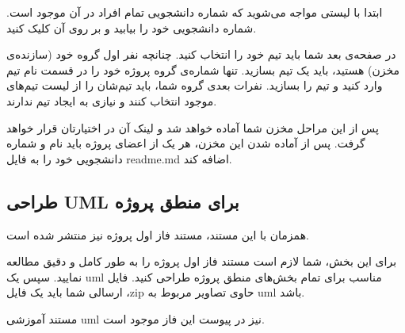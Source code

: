 \documentclass[]{article}
\begin{document}
ابتدا با لیستی مواجه می‌شوید که شماره دانشجویی تمام افراد در آن موجود است. شماره دانشجویی خود را بیابید و بر روی آن کلیک کنید.

در صفحه‌ی بعد شما باید تیم خود را انتخاب کنید. چنانچه نفر اول گروه خود (سازنده‌ی مخزن) هستید، باید یک تیم بسازید. تنها شماره‌ی گروه پروژه خود را در قسمت نام تیم وارد کنید و تیم را بسازید. نفرات بعدی گروه شما، باید تیم‌شان را از لیست تیم‌های موجود انتخاب کنند و نیازی به ایجاد تیم ندارند.

پس از این مراحل مخزن شما آماده خواهد شد و لینک آن در اختیارتان قرار خواهد گرفت. پس از آماده شدن این مخزن، هر یک از اعضای پروژه باید نام و شماره دانشجویی خود را به فایل readme.md اضافه کند.

\newpage
\subsection*{{\titr طراحی UML برای منطق پروژه}}
\label{subsec:uml}

همزمان با این مستند، مستند فاز اول پروژه نیز منتشر شده است.

برای این بخش، شما لازم است مستند فاز اول پروژه را به طور کامل و دقیق مطالعه نمایید. سپس یک uml مناسب برای تمام بخش‌های منطق پروژه طراحی کنید. فایل ارسالی شما باید یک فایل ،zip حاوی تصاویر مربوط به uml باشد.

مستند آموزشی uml نیز در پیوست این فاز موجود است.
\end{document}
